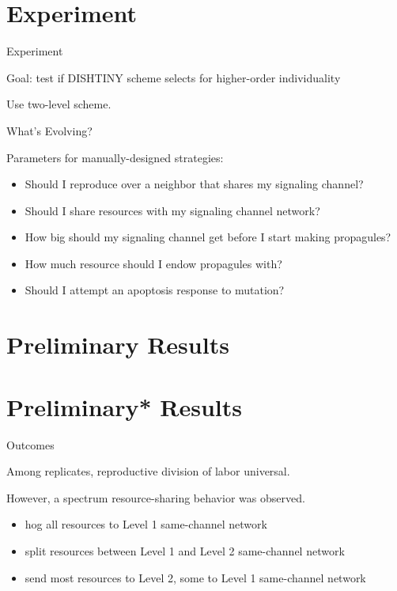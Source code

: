 \section{Experiment}

\begin{frame}{Experiment}

Goal: test if DISHTINY scheme selects for higher-order individuality

\pause

Use two-level scheme.

\end{frame}

\begin{frame}{What's Evolving?}

Parameters for manually-designed strategies:
\pause
\begin{itemize}[<+->]
\item Should I reproduce over a neighbor that shares my signaling channel?
\item Should I share resources with my signaling channel network?
\item How big should my signaling channel get before I start making propagules?
\item How much resource should I endow propagules with?
\item Should I attempt an apoptosis response to mutation?
\end{itemize}
\end{frame}

\section{Preliminary Results}
\section{Preliminary\** Results}


\begin{frame}{Outcomes}

Among replicates, reproductive division of labor universal.

\pause
\vspace{2ex}

However, a spectrum resource-sharing behavior was observed.

\begin{itemize}[<+->]
\item hog all resources to Level 1 same-channel network
\item split resources between Level 1 and Level 2 same-channel network
\item send most resources to Level 2, some to Level 1 same-channel network
\end{itemize}

\end{frame}

